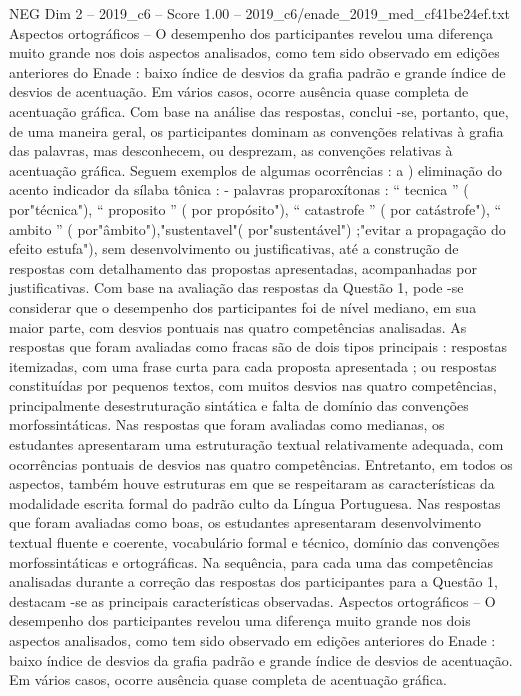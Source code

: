 \begin{textsample}{NEG Dim 2 – 2019\_c6 – Score 1.00 – 2019\_c6/enade\_2019\_med\_cf41be24ef.txt}
Aspectos ortográficos – O desempenho dos participantes revelou uma diferença muito grande nos dois aspectos analisados, como tem sido observado em edições anteriores do Enade : baixo índice de desvios da grafia padrão e grande índice de desvios de acentuação.
Em vários casos, ocorre ausência quase completa de acentuação gráfica.
Com base na análise das respostas, conclui -se, portanto, que, de uma maneira geral, os participantes dominam as convenções relativas à grafia das palavras, mas desconhecem, ou desprezam, as convenções relativas à acentuação gráfica.
Seguem exemplos de algumas ocorrências : a ) eliminação do acento indicador da sílaba tônica : - palavras proparoxítonas : “ tecnica ” ( por"técnica"), “ proposito ” ( por propósito"), “ catastrofe ” ( por catástrofe"), “ ambito ” ( por"âmbito"),"sustentavel"( por"sustentável") ;"evitar a propagação do efeito estufa"), sem desenvolvimento ou justificativas, até a construção de respostas com detalhamento das propostas apresentadas, acompanhadas por justificativas.
Com base na avaliação das respostas da Questão 1, pode -se considerar que o desempenho dos participantes foi de nível mediano, em sua maior parte, com desvios pontuais nas quatro competências analisadas.
As respostas que foram avaliadas como fracas são de dois tipos principais : respostas itemizadas, com uma frase curta para cada proposta apresentada ; ou respostas constituídas por pequenos textos, com muitos desvios nas quatro competências, principalmente desestruturação sintática e falta de domínio das convenções morfossintáticas.
Nas respostas que foram avaliadas como medianas, os estudantes apresentaram uma estruturação textual relativamente adequada, com ocorrências pontuais de desvios nas quatro competências.
Entretanto, em todos os aspectos, também houve estruturas em que se respeitaram as características da modalidade escrita formal do padrão culto da Língua Portuguesa.
Nas respostas que foram avaliadas como boas, os estudantes apresentaram desenvolvimento textual fluente e coerente, vocabulário formal e técnico, domínio das convenções morfossintáticas e ortográficas.
Na sequência, para cada uma das competências analisadas durante a correção das respostas dos participantes para a Questão 1, destacam -se as principais características observadas.
Aspectos ortográficos – O desempenho dos participantes revelou uma diferença muito grande nos dois aspectos analisados, como tem sido observado em edições anteriores do Enade : baixo índice de desvios da grafia padrão e grande índice de desvios de acentuação.
Em vários casos, ocorre ausência quase completa de acentuação gráfica.

\end{textsample}
